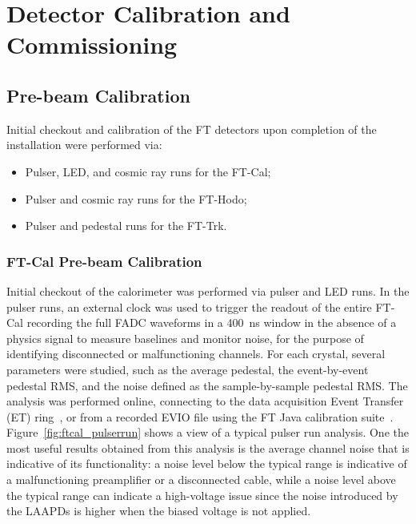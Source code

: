 \section{Detector Calibration and Commissioning}
\label{sec:calibration}

\subsection{Pre-beam Calibration}

Initial checkout and calibration of the FT detectors upon completion of the installation were performed via:
\begin{itemize}
    \item Pulser, LED, and cosmic ray runs for the FT-Cal;
    \item Pulser and cosmic ray runs for the FT-Hodo;
    \item Pulser and pedestal runs for the FT-Trk.
\end{itemize}

\subsubsection{FT-Cal Pre-beam Calibration}

Initial checkout of the calorimeter was performed via pulser and LED runs. In the pulser runs, an external clock was
used to trigger the readout of the entire FT-Cal recording the full FADC waveforms in a 400~ns window in the
absence of a physics signal to measure baselines and monitor noise, for the purpose of identifying disconnected
or malfunctioning channels. For each crystal, several parameters were studied, such as the average pedestal, the
event-by-event pedestal RMS, and the noise defined as the sample-by-sample pedestal RMS. The analysis was
performed online, connecting to the data acquisition Event Transfer (ET) ring~\cite{daq}, or from a recorded
EVIO file using the FT Java calibration suite~\cite{reconstruction}. Figure~\ref{fig:ftcal_pulserrun} shows a
view of a typical pulser run analysis. One the most useful results obtained from this analysis is the average channel
noise that is indicative of its functionality: a noise level below the typical range is indicative of a malfunctioning
preamplifier or a disconnected cable, while a noise level above the typical range can indicate a high-voltage issue
since the noise introduced by the LAAPDs is higher when the biased voltage is not applied. 

